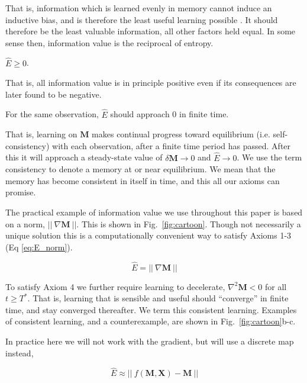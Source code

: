That is, information which is learned evenly in memory cannot induce an inductive bias, and is therefore the least useful learning possible \cite{Mitchell1980,Thrun1998}. It should therefore be the least valuable information, all other factors held equal. In some sense then, information value is the reciprocal of entropy.

\begin{axiom}
	$\hat E \ge 0$.
\end{axiom}

That is, all information value is in principle positive even if its consequences are later found to be negative.

\begin{axiom}
	For the same observation, $\hat E$ should approach 0 in finite time.
\end{axiom}

That is, learning on $\mathbf{M}$ makes continual progress toward equilibrium (i.e. self-consistency) with each observation, after a finite time period has passed. After this it will approach a steady-state value of $\delta \mathbf{M} \rightarrow 0$ and $\hat E \rightarrow 0$. We use the term consistency to denote a memory at or near equilibrium. We mean that the memory has become consistent in itself in time, and this all our axioms can promise. 

The practical example of information value we use throughout this paper is based on a norm, $|| \ \nabla \mathbf{M} \ ||$. This is shown in Fig.~\ref{fig:cartoon}. Though not necessarily a unique solution this is a computationally convenient way to satisfy Axioms 1-3 (Eq \ref{eq:E_norm}). 

\begin{equation}
	\label{eq:E_norm}
	\hat E = || \ \nabla \mathbf{M} \ ||
\end{equation}

To satisfy Axiom 4 we further require learning to decelerate, $\nabla^2 \mathbf{M} < 0$ for all $ t \ge T^*$. That is, learning that is sensible and useful should ``converge'' in finite time, and stay converged thereafter. We term this consistent learning. Examples of consistent learning, and a counterexample, are shown in Fig.~\ref{fig:cartoon}b-c. 

In practice here we will not work with the gradient, but will use a discrete map instead,

\begin{equation}
	\label{eq:E_norm_discrete}
	\hat E \approx || \ f(\mathbf{M},\mathbf{X}) - \mathbf{M} \ ||
\end{equation}

